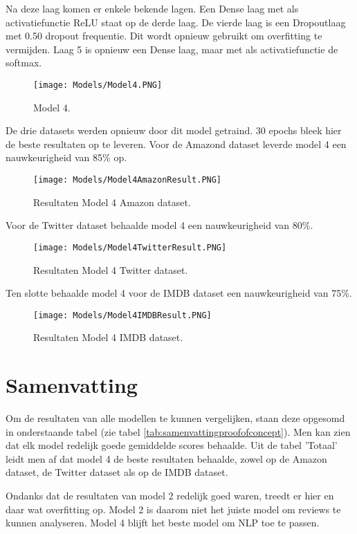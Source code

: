 Na deze laag komen er enkele bekende lagen. Een Dense laag met als activatiefunctie ReLU staat op de derde laag. De vierde laag is een Dropoutlaag met 0.50 dropout frequentie. Dit wordt opnieuw gebruikt om overfitting te vermijden. Laag 5 is opnieuw een Dense laag, maar met als activatiefunctie de softmax.

\begin{figure}[!htbp]
    \texttt{[image: Models/Model4.PNG]}
    \caption{\label{model4}Model 4.}
\end{figure}
\FloatBarrier

De drie datasets werden opnieuw door dit model getraind. 30 epochs bleek hier de beste resultaten op te leveren. Voor de Amazond dataset leverde model 4 een nauwkeurigheid van 85\% op.

\begin{figure}[!htbp]
    \texttt{[image: Models/Model4AmazonResult.PNG]}
    \caption{\label{model4amazon}Resultaten Model 4 Amazon dataset.}
\end{figure}
\FloatBarrier

Voor de Twitter dataset behaalde model 4 een nauwkeurigheid van 80\%.

\begin{figure}[!htbp]
    \texttt{[image: Models/Model4TwitterResult.PNG]}
    \caption{\label{model4twitter}Resultaten Model 4 Twitter dataset.}
\end{figure}
\FloatBarrier

Ten slotte behaalde model 4 voor de IMDB dataset een nauwkeurigheid van 75\%.

\begin{figure}[!htbp]
    \texttt{[image: Models/Model4IMDBResult.PNG]}
    \caption{\label{model4imdb}Resultaten Model 4 IMDB dataset.}
\end{figure}
\FloatBarrier

\section{Samenvatting}
Om de resultaten van alle modellen te kunnen vergelijken, staan deze opgesomd in onderstaande tabel (zie tabel \ref{tab:samenvattingproofofconcept}). Men kan zien dat elk model redelijk goede gemiddelde scores behaalde. Uit de tabel 'Totaal' leidt men af dat model 4 de beste resultaten behaalde, zowel op de Amazon dataset, de Twitter dataset als op de IMDB dataset.

Ondanks dat de resultaten van model 2 redelijk goed waren, treedt er hier en daar wat overfitting op. Model 2 is daarom niet het juiste model om reviews te kunnen analyseren. Model 4 blijft het beste model om NLP toe te passen.



